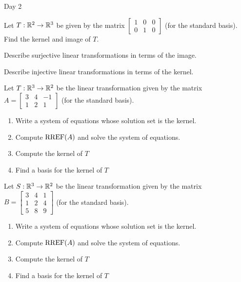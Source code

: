 \documentclass{article}[12pt]
\begin{document}
\begin{applicationActivities}{Day 2}
\begin{activity}
Let $T: \mathbb{R}^2 \rightarrow \mathbb{R}^3$ be given by the matrix $\begin{bmatrix} 1 & 0 &0  \\ 0 & 1 & 0 \end{bmatrix}$ (for the standard basis).  Find the kernel and image of $T$.
\end{activity}

\begin{activity}
Describe surjective linear transformations in terms of the image.
\end{activity}

\begin{activity}
Describe injective linear transformations in terms of the kernel.
\end{activity}

\begin{activity}
Let $T: \mathbb{R}^3 \rightarrow \mathbb{R}^2$ be the linear transformation given by the matrix $A=\begin{bmatrix} 3 & 4 & -1 \\ 1 & 2 & 1 \end{bmatrix}$ (for the standard basis).
\begin{enumerate}[1)]
\item Write a system of equations whose solution set is the kernel.
\item Compute $\operatorname{RREF}(A)$ and solve the system of equations.
\item Compute the kernel of $T$
\item Find a basis for the kernel of $T$
\end{enumerate}
\end{activity}

\begin{activity}
Let $S: \mathbb{R}^3 \rightarrow \mathbb{R}^2$ be the linear transformation given by the matrix $B=\begin{bmatrix} 3 & 4 & 1 \\ 1 & 2 & 4 \\ 5 & 8 & 9 \end{bmatrix}$ (for the standard basis).
\begin{enumerate}[1)]
\item Write a system of equations whose solution set is the kernel.
\item Compute $\operatorname{RREF}(A)$ and solve the system of equations.
\item Compute the kernel of $T$
\item Find a basis for the kernel of $T$
\end{enumerate}
\end{activity}


\end{applicationActivities}
\end{document}
